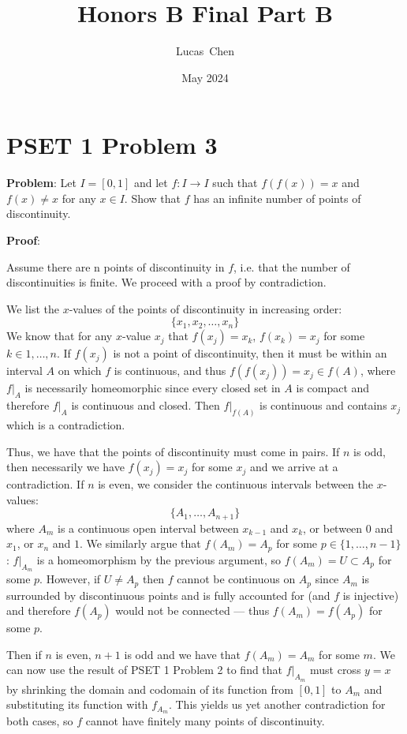 \documentclass{amsart}
\title{Honors B Final Part B}
\author{Lucas\ Chen}
\date{May 2024}
\begin{document}
\maketitle

\maketitle

\section{PSET 1 Problem 3}
\textbf{Problem}: Let $I=[0,1]$ and let $f:I\rightarrow I$ such that $f(f(x))=x$ and $f(x)\neq x$ for any $x\in I$. Show that $f$ has an infinite number of points of discontinuity.

\noindent\textbf{Proof}:

Assume there are n points of discontinuity in $f$, i.e. that the number of discontinuities is finite. We proceed with a proof by contradiction.

We list the $x$-values of the points of discontinuity in increasing order: $$\{x_1, x_2,\dots, x_n\}$$ We know that for any $x$-value $x_j$ that $f(x_j) = x_k$, $f(x_k)=x_j$ for some $k\in{1,\dots,n}$. If $f(x_j)$ is not a point of discontinuity, then it must be within an interval $A$ on which $f$ is continuous, and thus $f(f(x_j))=x_j\in f(A)$, where $f|_A$ is necessarily homeomorphic since every closed set in $A$ is compact  and therefore $f|_A$ is continuous and closed. Then $f|_{f(A)}$ is continuous and contains $x_j$ which is a contradiction.

Thus, we have that the points of discontinuity must come in pairs. If $n$ is odd, then necessarily we have $f(x_j) = x_j$ for some $x_j$ and we arrive at a contradiction. If $n$ is even, we consider the continuous intervals between the $x$-values: $$\{A_1,\dots,A_{n+1}\}$$ where $A_m$ is a continuous open interval between $x_{k-1}$ and $x_{k}$, or between $0$ and $x_1$, or $x_n$ and $1$. We similarly argue that $f(A_m)=A_p$ for some $p\in\{1,\dots,n-1\}$: $f|_{A_m}$ is a homeomorphism by the previous argument, so $f(A_m)=U\subset A_p$ for some $p$. However, if $U\neq A_p$ then $f$ cannot be continuous on $A_p$ since $A_m$ is surrounded by discontinuous points and is fully accounted for (and $f$ is injective) and therefore $f(A_p)$ would not be connected — thus $f(A_m) = f(A_p)$ for some $p$. 

Then if $n$ is even, $n+1$ is odd and we have that $f(A_m)=A_m$ for some $m$. We can now use the result of PSET 1 Problem 2 to find that $f|_{A_m}$ must cross $y=x$ by shrinking the domain and codomain of its function from $[0,1]$ to $A_m$ and substituting its function with $f_{A_m}$. This yields us yet another contradiction for both cases, so $f$ cannot have finitely many points of discontinuity.
\end{document}
